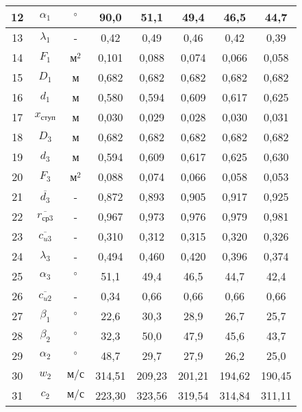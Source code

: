 \begin{center}
\begin{longtable}{|c|c|c|c|c|c|c|c|}
				12 & $\alpha_1$ & $\degree$ & 90,0 & 51,1 & 49,4 & 46,5 & 44,7 \\\hline
			
				13 & $\lambda_1$ & - & 0,42 & 0,49 & 0,46 & 0,42 & 0,39 \\\hline
			
				14 & $F_1$ & $м^2$ & 0,101 & 0,088 & 0,074 & 0,066 & 0,058 \\\hline
			
				15 & $D_1$ & м & 0,682 & 0,682 & 0,682 & 0,682 & 0,682 \\\hline
			
				16 & $d_1$ & м & 0,580 & 0,594 & 0,609 & 0,617 & 0,625 \\\hline
			
				17 & $x_{ступ}$ & м & 0,030 & 0,029 & 0,028 & 0,030 & 0,031 \\\hline
			
				18 & $D_3$ & м & 0,682 & 0,682 & 0,682 & 0,682 & 0,682 \\\hline
			
				19 & $d_3$ & м & 0,594 & 0,609 & 0,617 & 0,625 & 0,630 \\\hline
			
				20 & $F_3$ & $м^2$ & 0,088 & 0,074 & 0,066 & 0,058 & 0,053 \\\hline
			
				21 & $\overline{d_3}$ & - & 0,872 & 0,893 & 0,905 & 0,917 & 0,925 \\\hline
			
				22 & $\overline{r_{ср3}}$ & - & 0,967 & 0,973 & 0,976 & 0,979 & 0,981 \\\hline
			
				23 & $\overline{c_{u3}}$ & - & 0,310 & 0,312 & 0,315 & 0,320 & 0,326 \\\hline
			
				24 & $\lambda_3$ & - & 0,494 & 0,460 & 0,420 & 0,396 & 0,374 \\\hline
			
				25 & $\alpha_3$ & $\degree$ & 51,1 & 49,4 & 46,5 & 44,7 & 42,4 \\\hline
			
				26 & $\overline{c_{u2}}$ & - & 0,34 & 0,66 & 0,66 & 0,66 & 0,66 \\\hline
			
				27 & $\beta_1$ & $\degree$ & 22,6 & 30,3 & 28,9 & 26,7 & 25,7 \\\hline
			
				28 & $\beta_2$ & $\degree$ & 32,3 & 50,0 & 47,9 & 45,6 & 43,7 \\\hline
			
				29 & $\alpha_2$ & $\degree$ & 48,7 & 29,7 & 27,9 & 26,2 & 25,0 \\\hline
			
				30 & $w_2$ & $м/с$ & 314,51 & 209,23 & 201,21 & 194,62 & 190,45 \\\hline
			
				31 & $c_2$ & $м/с$ & 223,30 & 323,56 & 319,54 & 314,84 & 311,11 \\\hline
			
		\end{longtable}
	\end{center}
